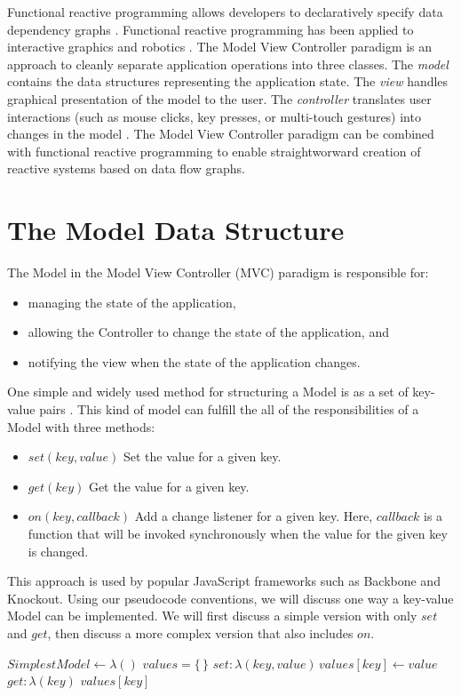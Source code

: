 Functional reactive programming allows developers to declaratively specify data dependency graphs \cite{wan2000functional}. Functional reactive programming has been applied to interactive graphics \cite{elliott1997functional} and robotics \cite{hudak2003arrows}. The Model View Controller paradigm is an approach to cleanly separate application operations into three classes. The \emph{model} contains the data structures representing the application state. The \emph{view} handles graphical presentation of the model to the user. The \emph{controller} translates user interactions (such as mouse clicks, key presses, or multi-touch gestures) into changes in the model \cite{krasner1988description}. The Model View Controller paradigm can be combined with functional reactive programming to enable straightworward creation of reactive systems based on data flow graphs.
\section{The Model Data Structure}
The Model in the Model View Controller (MVC) paradigm is responsible for:
\begin{itemize}
\item managing the state of the application,
\item allowing the Controller to change the state of the application, and 
\item notifying the view when the state of the application changes.
\end{itemize}

One simple and widely used method for structuring a Model is as a set of key-value pairs \cite{leff2001web}. This kind of model can fulfill the all of the responsibilities of a Model with three methods:

\begin{itemize}
\item $set(key, value)$ Set the value for a given key.
\item $get(key)$ Get the value for a given key.
\item $on(key, callback)$ Add a change listener for a given key. Here, $callback$ is a function that will be invoked synchronously when the value for the given key is changed.
\end{itemize}

This approach is used by popular JavaScript frameworks such as Backbone and Knockout. Using our pseudocode conventions, we will discuss one way a key-value Model can be implemented. We will first discuss a simple version with only $set$ and $get$, then discuss a more complex version that also includes $on$.
\begin{codebox}
\li $SimplestModel \gets \lambda()$ \label{simplestModelConstructor}
\Do
  \li $values = \{\,\}$ \label{simplestModelValues}
  \li \Return \label{simplestModelMethodsBegin}
  \Do
    \li $set: \lambda(key, value) \, values[key] \gets value$
    \li $get: \lambda(key)$ \Return $values[key]$ \label{simplestModelMethodsEnd}
  \End
\End
\end{codebox}

